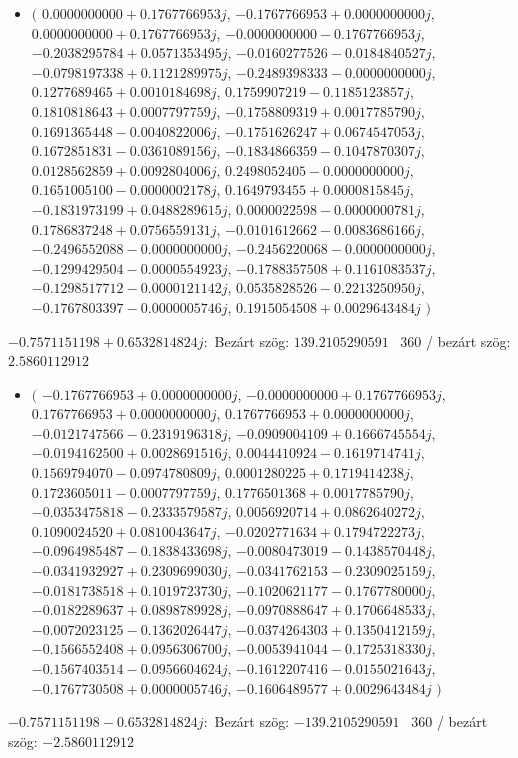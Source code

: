 \documentclass[14pt,a4paper]{article}
\begin{document}
\begin{itemize}
\item
$\big($
$0.0000000000+0.1767766953j$, $-0.1767766953+0.0000000000j$, $0.0000000000+0.1767766953j$, $-0.0000000000-0.1767766953j$, $-0.2038295784+0.0571353495j$, $-0.0160277526-0.0184840527j$, $-0.0798197338+0.1121289975j$, $-0.2489398333-0.0000000000j$, $0.1277689465+0.0010184698j$, $0.1759907219-0.1185123857j$, $0.1810818643+0.0007797759j$, $-0.1758809319+0.0017785790j$, $0.1691365448-0.0040822006j$, $-0.1751626247+0.0674547053j$, $0.1672851831-0.0361089156j$, $-0.1834866359-0.1047870307j$, $0.0128562859+0.0092804006j$, $0.2498052405-0.0000000000j$, $0.1651005100-0.0000002178j$, $0.1649793455+0.0000815845j$, $-0.1831973199+0.0488289615j$, $0.0000022598-0.0000000781j$, $0.1786837248+0.0756559131j$, $-0.0101612662-0.0083686166j$, $-0.2496552088-0.0000000000j$, $-0.2456220068-0.0000000000j$, $-0.1299429504-0.0000554923j$, $-0.1788357508+0.1161083537j$, $-0.1298517712-0.0000121142j$, $0.0535828526-0.2213250950j$, $-0.1767803397-0.0000005746j$, $0.1915054508+0.0029643484j$
$\big)$
\end{itemize}
$-0.7571151198+0.6532814824j$:\
Bezárt szög: $139.2105290591$ \
360 / bezárt szög: $2.5860112912$\
\begin{itemize}
\item
$\big($
$-0.1767766953+0.0000000000j$, $-0.0000000000+0.1767766953j$, $0.1767766953+0.0000000000j$, $0.1767766953+0.0000000000j$, $-0.0121747566-0.2319196318j$, $-0.0909004109+0.1666745554j$, $-0.0194162500+0.0028691516j$, $0.0044410924-0.1619714741j$, $0.1569794070-0.0974780809j$, $0.0001280225+0.1719414238j$, $0.1723605011-0.0007797759j$, $0.1776501368+0.0017785790j$, $-0.0353475818-0.2333579587j$, $0.0056920714+0.0862640272j$, $0.1090024520+0.0810043647j$, $-0.0202771634+0.1794722273j$, $-0.0964985487-0.1838433698j$, $-0.0080473019-0.1438570448j$, $-0.0341932927+0.2309699030j$, $-0.0341762153-0.2309025159j$, $-0.0181738518+0.1019723730j$, $-0.1020621177-0.1767780000j$, $-0.0182289637+0.0898789928j$, $-0.0970888647+0.1706648533j$, $-0.0072023125-0.1362026447j$, $-0.0374264303+0.1350412159j$, $-0.1566552408+0.0956306700j$, $-0.0053941044-0.1725318330j$, $-0.1567403514-0.0956604624j$, $-0.1612207416-0.0155021643j$, $-0.1767730508+0.0000005746j$, $-0.1606489577+0.0029643484j$
$\big)$
\end{itemize}
$-0.7571151198-0.6532814824j$:\
Bezárt szög: $-139.2105290591$ \
360 / bezárt szög: $-2.5860112912$\
\end{document}
